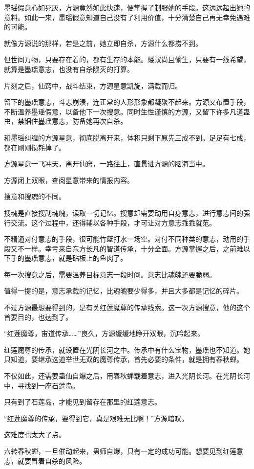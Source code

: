 \begin{this_body}
墨瑶假意心如死灰，方源竟然如此快速，便掌握了制服她的手段。这远远超出她的意料。如此一来，墨瑶假意知道自己没有了利用价值，十分清楚自己再无幸免遇难的可能。

就像方源说的那样，若是之前，她立即自杀，方源什么都捞不到。

但世间万物，只要存在着的，都有生存的本能。蝼蚁尚且偷生，只要有一线希望，就算是墨瑶意志，也没有自杀陨灭的打算。

片刻之后，仙窍中，战斗结束，方源星意凯旋，满载而归。

留下的墨瑶意志，斗志崩溃，连正常的人形形象都凝聚不起来。方源又布置手段，不断温养墨瑶假意，以备他下一次搜意。同时生性谨慎的方源，又留下许多凡道蛊虫，禁锢住墨瑶意志，防备她再次自杀。

和墨瑶纠缠的方源星意，彻底脱离开来，体积只剩下原先三成不到。足足有七成，都在刚刚损耗掉了。

方源星意一飞冲天，离开仙窍，一路往上，直贯进方源的脑海当中。

方源闭上双眼，查阅星意带来的情报内容。

搜意和搜魂的不同。

搜魂是直接搜刮魂魄，读取一切记忆。搜意却需要动用自身意志，进行意志间的强行交流。这个过程中，还得辅以各种手段，才可让对方意志乖乖就范。

不精通对付意志的手段，很可能竹篮打水一场空。对付不同种类的意志，动用的手段又不一样。幸亏来自东方长凡的智道传承，十分全面。方源掌握之后，之前难以下手的墨瑶意志，就是砧板上的鱼肉了。

每一次搜意之后，需要温养目标意志一段时间。意志比魂魄还要脆弱。

值得一提的是，意志承载的记忆，比魂魄要少得多，并且大多都是记忆的碎片。

不过方源最想要得到的，是有关红莲魔尊的传承线索。这一次方源搜意，他的这个首要目的，也达到了。

“红莲魔尊，宙道传承……”良久，方源缓缓地睁开双眼，沉吟起来。

红莲魔尊的传承，就设置在光阴长河之中。传承中有什么宝物，墨瑶也不知道。她只知道，要继承这道举世无双的魔尊传承，首先必要的条件，就是拥有春秋蝉。

不仅如此，还需要蛊仙自爆之后，用春秋蝉载着意志，进入光阴长河。在光阴长河中，寻找到一座石莲岛。

只有到了石莲岛，才能见到留存在那里的红莲意志。

“红莲魔尊的传承，要得到它，真是艰难无比啊！”方源暗叹。

这难度也太大了点。

六转春秋蝉，一旦催动起来，蛊师自爆，只有一定的成功可能。想要见到红莲意志，就要冒着自杀的风险。


\end{this_body}

